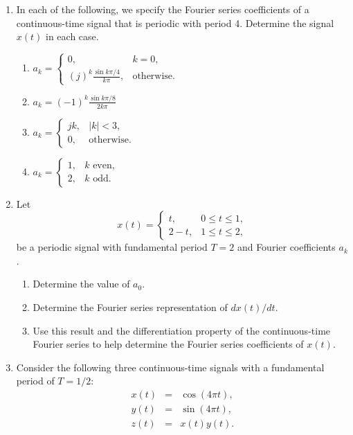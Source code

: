 \documentclass[11pt]{article}
\begin{document}
\begin{enumerate}
\item In each of the following, we specify the Fourier series coefficients of a continuous-time signal that is periodic with period 4. Determine the signal $x(t)$ in each case.
    \begin{enumerate}
        \item $a_k = \begin{cases}0, & k =0,\\ (j)^k \frac{\sin k \pi/4}{k\pi}, & \text{otherwise}.        \end{cases}$
        \item $a_k = (-1)^k \frac{\sin k \pi/8}{2k\pi}$
        \item $a_k = \begin{cases} jk, & |k| < 3,\\ 0, & \text{otherwise}.        \end{cases}$
        \item $a_k = \begin{cases} 1, &  k \text{ even},\\ 2, & k \text{ odd}.        \end{cases}$
    \end{enumerate}


\item Let
    \begin{equation*}
        x(t) = \begin{cases} t, &  0 \leq t \leq 1,\\ 2-t, & 1 \leq t \leq 2,        \end{cases}
    \end{equation*}
    be a periodic signal with fundamental period $T=2$ and Fourier coefficients $a_k$.
    \begin{enumerate}
        \item Determine the value of $a_0$.
        \item Determine the Fourier series representation of $dx(t)/dt$.
        \item Use this result and the differentiation property of the continuous-time Fourier series to help determine the Fourier series coefficients of $x(t)$.
    \end{enumerate}


\item Consider the following three continuous-time signals with a fundamental period of $T=1/2$:
    \begin{eqnarray*}
      x(t) &=& \cos(4\pi t), \\
      y(t) &=& \sin(4\pi t), \\
      z(t) &=& x(t)y(t).
    \end{eqnarray*}


\end{enumerate}
\end{document}
